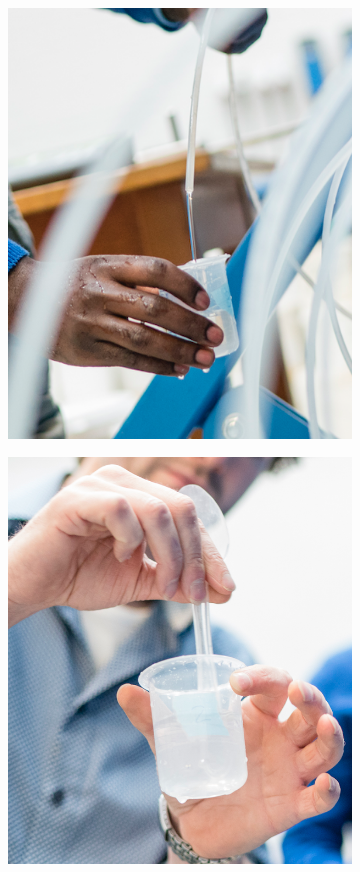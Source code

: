 \begin{figure}[ht!]
\centering
\begin{subfigure}{.14\textwidth}
  \centering
  \includegraphics[width=.9\linewidth]{Images/Sample_1.png}
\end{subfigure}
\begin{subfigure}{.149\textwidth}
  \centering
  \includegraphics[width=.9\linewidth]{Images/Sample_2.png}

\end{subfigure}
\end{figure}

